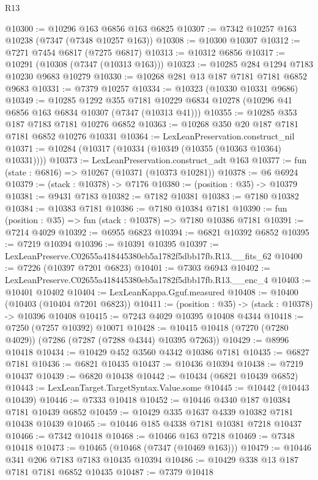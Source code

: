 \begin{lexlean}{R13}
\begin{coremodule}
@10300 := @10296 @163 @6856 @163 @6825
@10307 := @7342 @10257 @163 @10238 (@7347 (@7348 @10257 @163))
@10308 := @10300 @10307
@10312 := @7271 @7454 @6817 (@7275 @6817)
@10313 := @10312 @6856
@10317 := @10291 (@10308 (@7347 (@10313 @163)))
@10323 := @10285 @284 @1294 @7183 @10230 @9683 @10279
@10330 := @10268 @281 @13 @187 @7181 @7181 @6852 @9683
@10331 := @7379 @10257
@10334 := @10323 (@10330 @10331 @9686)
@10349 := @10285
    @1292
    @355
    @7181
    @10229
    @6834
    @10278
    (@10296 @41 @6856 @163 @6834 @10307 (@7347 (@10313 @41)))
@10355 := @10285 @353 @187 @7183 @7181 @10276 @6852
@10363 := @10268 @350 @20 @187 @7181 @7181 @6852 @10276 @10331
@10364 := LexLeanPreservation.construct_nil
@10371 := @10284 (@10317 (@10334 (@10349 (@10355 (@10363 @10364) @10331))))
@10373 := LexLeanPreservation.construct_adt @163
@10377 := fun (state : @6816) => @10267 (@10371 (@10373 @10281))
@10378 := @6 @6924
@10379 := (stack : @10378) -> @7176
@10380 := (position : @35) -> @10379
@10381 := @9431 @7183
@10382 := @7182 @10381
@10383 := @7180 @10382
@10384 := @10383 @7181
@10386 := @7180 @10384 @7181
@10390 := fun (position : @35) => fun (stack : @10378) => @7180 @10386 @7181
@10391 := @7214 @4029
@10392 := @6955 @6823
@10394 := @6821 @10392 @6852
@10395 := @7219 @10394
@10396 := @10391 @10395
@10397 := LexLeanPreserve.C02655a418445380eb5a1782f5dbb17fb.R13.__fits_62
@10400 := @7226 (@10397 @7201 @6823)
@10401 := @7303 @6943
@10402 := LexLeanPreserve.C02655a418445380eb5a1782f5dbb17fb.R13.__enc_4
@10403 := @10401 @10402
@10404 := LexLeanKappa.Gguf.measured
@10408 := @10400 (@10403 (@10404 @7201 @6823))
@10411 := (position : @35) -> (stack : @10378) -> @10396 @10408
@10415 := @7243 @4029 @10395 @10408 @4344
@10418 := @7250 (@7257 @10392) @10071
@10428 := @10415 @10418 (@7270 (@7280 @4029)) (@7286 (@7287 (@7288 @4344) @10395 @7263))
@10429 := @8996 @10418
@10434 := @10429 @452 @3560 @4342 @10386 @7181
@10435 := @6827 @7181
@10436 := @6821 @10435
@10437 := @10436 @10394
@10438 := @7219 @10437
@10439 := @6820 @10438
@10442 := @10434 (@6821 @10439 @6852)
@10443 := LexLeanTarget.TargetSyntax.Value.some
@10445 := @10442 (@10443 @10439)
@10446 := @7333 @10418
@10452 := @10446 @4340 @187 @10384 @7181 @10439 @6852
@10459 := @10429 @335 @1637 @4339 @10382 @7181 @10438 @10439
@10465 := @10446 @185 @4338 @7181 @10381 @7218 @10437
@10466 := @7342 @10418
@10468 := @10466 @163 @7218
@10469 := @7348 @10418
@10473 := @10465 (@10468 (@7347 (@10469 @163)))
@10479 := @10446 @341 @206 @7183 @7183 @10435 @10394
@10486 := @10429 @338 @13 @187 @7181 @7181 @6852 @10435
@10487 := @7379 @10418

\end{coremodule}
\end{lexlean}
